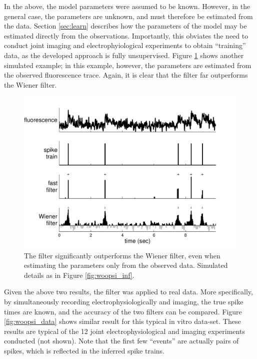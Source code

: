 In the above, the model parameters were assumed to be known.  However, in the general case, the parameters are unknown, and must therefore be estimated from the data.  Section \ref{sec:learn} describes how the parameters of the model may be estimated directly from the observations.  Importantly, this obviates the need to conduct joint imaging and electrophyiological experiments to obtain ``training'' data, as the developed approach is fully unsupervised.  Figure \ref{fig:woopsi_learn} shows another simulated example; in this example, however, the parameters are estimated from the observed fluorescence trace.  Again, it is clear that the \foopsi filter far outperforms the Wiener filter.

\begin{figure}[h!]
\centering \includegraphics[width=.9\linewidth]{../figs/woopsi_learn}
\caption{The \foopsi filter significantly outperforms the Wiener filter, even when estimating the parameters only from the observed data.  Simulated details as in Figure \ref{fig:woopsi_inf}.} \label{fig:woopsi_learn}
\end{figure}

Given the above two results, the \foopsi filter was applied to real data.  More specifically, by simultaneously recording electrophysiologically and imaging, the true spike times are known, and the accuracy of the two filters can be compared.  Figure \ref{fig:woopsi_data} shows similar result for this typical in vitro data-set.  These results are typical of the 12 joint electrophysiological and imaging experiments conducted (not shown). Note that the first few ``events'' are actually pairs of spikes, which is reflected in the inferred spike trains.


